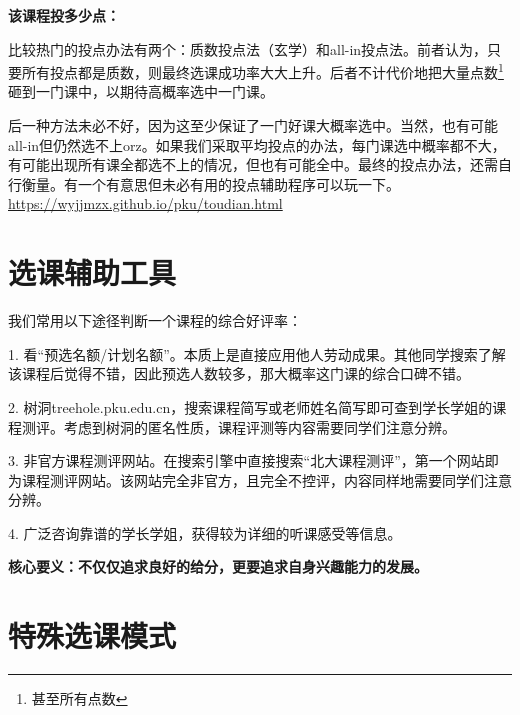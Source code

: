 \documentclass[11pt,oneside]{book}
\begin{document}
\vspace{10pt}

\textbf{该课程投多少点：}

\vspace{10pt}

比较热门的投点办法有两个：质数投点法（玄学）和all-in投点法。前者认为，只要所有投点都是质数，则最终选课成功率大大上升。后者不计代价地把大量点数\footnote{甚至所有点数}砸到一门课中，以期待高概率选中一门课。

\vspace{10pt}

后一种方法未必不好，因为这至少保证了一门好课大概率选中。当然，也有可能all-in但仍然选不上orz。如果我们采取平均投点的办法，每门课选中概率都不大，有可能出现所有课全都选不上的情况，但也有可能全中。最终的投点办法，还需自行衡量。有一个有意思但未必有用的投点辅助程序可以玩一下。\href{https://wyjjmzx.github.io/pku/toudian.html}{https://wyjjmzx.github.io/pku/toudian.html}

\section{选课辅助工具}
我们常用以下途径判断一个课程的综合好评率：

\vspace{10pt}

1. 看“预选名额/计划名额”。本质上是直接应用他人劳动成果。其他同学搜索了解该课程后觉得不错，因此预选人数较多，那大概率这门课的综合口碑不错。

\vspace{10pt}

2. 树洞treehole.pku.edu.cn，搜索课程简写或老师姓名简写即可查到学长学姐的课程测评。考虑到树洞的匿名性质，课程评测等内容需要同学们注意分辨。

\vspace{10pt}

3. 非官方课程测评网站。在搜索引擎中直接搜索“北大课程测评”，第一个网站即为课程测评网站。该网站完全非官方，且完全不控评，内容同样地需要同学们注意分辨。

\vspace{10pt}

4. 广泛咨询靠谱的学长学姐，获得较为详细的听课感受等信息。

\vspace{10pt}

\textbf{核心要义：不仅仅追求良好的给分，更要追求自身兴趣能力的发展。}

\section{特殊选课模式}
\end{document}
